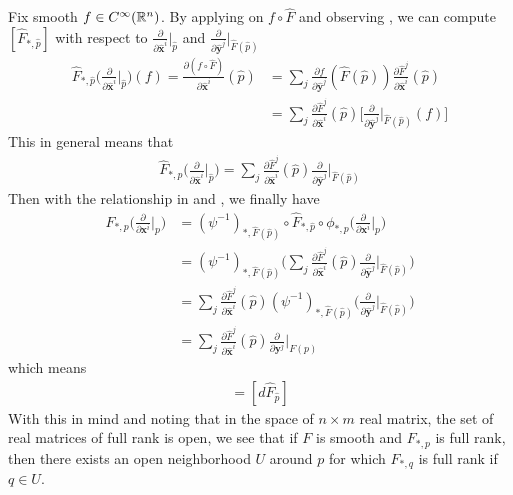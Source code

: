 \documentclass{report}
\begin{document}
\begin{mdframed}
Fix smooth $f\in C^{\infty}(\mathbb{R}^n)$. By applying   on $f\circ \widehat{F}$ and observing , we can compute $[\widehat{F}_{*,\widehat{p}}]$ with respect to $\frac{\partial }{\partial \widehat{\textbf{x}}^i}|_{\widehat{p}}$ and $\frac{\partial }{\partial \widehat{\textbf{y}}^j}|_{\widehat{F}(\widehat{p})}$ 
\begin{align*}
\widehat{F}_{*,\widehat{p}} \Big( \frac{\partial }{\partial \widehat{\textbf{x}}^i} \Big|_{\widehat{p}} \Big)(f)= \frac{\partial  (f\circ \widehat{F})}{\partial \widehat{\textbf{x}}^i}(\widehat{p})&= \sum_j \frac{\partial f}{\partial \widehat{\textbf{y}}^j} (\widehat{F}(\widehat{p})) \frac{\partial \widehat{F}^j}{\partial \widehat{\textbf{x}}^i}(\widehat{p}) \\
 &=\sum_j \frac{\partial \widehat{F}^j}{\partial \widehat{\textbf{x}}^i}(\widehat{p}) \Big[\frac{\partial }{\partial \widehat{\textbf{y}}^j}\Big|_{\widehat{F}(\widehat{p})}(f)\Big]
\end{align*}
This in general means that 
\begin{align*}
\widehat{F}_{*,p}\Big( \frac{\partial }{\partial \widehat{\textbf{x}}^i}\Big|_{\widehat{p}} \Big)= \sum_j \frac{\partial \widehat{F}^j}{\partial \widehat{\textbf{x}}^i}(\widehat{p}) \frac{\partial }{\partial \widehat{\textbf{y}}^j}\Big|_{\widehat{F}(\widehat{p})}
\end{align*}
Then with the relationship in  and , we finally have 
\begin{align*}
F_{*,p}\Big( \frac{\partial }{\partial \textbf{x}^i}\Big|_p \Big) &= (\psi^{-1})_{*,\widehat{F}(\widehat{p})}\circ \widehat{F}_{*,\widehat{p}} \circ \phi_{*,p} \Big( \frac{\partial }{\partial \textbf{x}^i}\Big|_p \Big) \\
&=(\psi^{-1})_{*,\widehat{F}(\widehat{p})} \Big( \sum_j \frac{\partial \widehat{F}^j}{\partial \widehat{\textbf{x}}^i}(\widehat{p}) \frac{\partial }{\partial \widehat{\textbf{y}}^j}\Big|_{\widehat{F}(\widehat{p})}  \Big) \\
&=\sum_j \frac{\partial \widehat{F}^j}{\partial \widehat{\textbf{x}}^i}(\widehat{p}) (\psi^{-1})_{*,\widehat{F}(\widehat{p})} \Big( \frac{\partial }{\partial \widehat{\textbf{y}}^j} \Big|_{\widehat{F}(\widehat{p})} \Big) \\
&=\sum_j \frac{\partial \widehat{F}^j}{\partial \widehat{\textbf{x}}^i}(\widehat{p}) \frac{\partial }{\partial \textbf{y}^j}\Big|_{F(p)} 
\end{align*}
which means 
\begin{align*}
[F_{*,p}]= [d\widehat{F}_{\widehat{p}}]
\end{align*}
With this in mind and noting that in the space of  $n\times m$ real matrix, the set of real matrices of full rank is open, we see that if $F$ is smooth and $F_{*,p}$ is full rank, then there exists an open neighborhood $U$ around $p$ for which  $F_{*,q}$ is full rank if $q\in U$.  \\


\end{mdframed}
\end{document}
